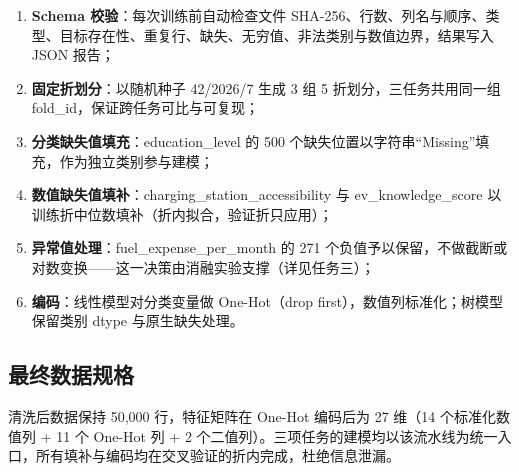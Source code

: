 \begin{enumerate}[itemsep=0pt]
\item \textbf{Schema 校验}：每次训练前自动检查文件 SHA-256、行数、列名与顺序、类型、目标存在性、重复行、缺失、无穷值、非法类别与数值边界，结果写入 JSON 报告；
\item \textbf{固定折划分}：以随机种子 42/2026/7 生成 3 组 5 折划分，三任务共用同一组 fold\_id，保证跨任务可比与可复现；
\item \textbf{分类缺失值填充}：education\_level 的 500 个缺失位置以字符串``Missing''填充，作为独立类别参与建模；
\item \textbf{数值缺失值填补}：charging\_station\_accessibility 与 ev\_knowledge\_score 以训练折中位数填补（折内拟合，验证折只应用）；
\item \textbf{异常值处理}：fuel\_expense\_per\_month 的 271 个负值予以保留，不做截断或对数变换——这一决策由消融实验支撑（详见任务三）；
\item \textbf{编码}：线性模型对分类变量做 One-Hot（drop first），数值列标准化；树模型保留类别 dtype 与原生缺失处理。
\end{enumerate}

\subsection{最终数据规格}

清洗后数据保持 50,000 行，特征矩阵在 One-Hot 编码后为 27 维（14 个标准化数值列 + 11 个 One-Hot 列 + 2 个二值列）。三项任务的建模均以该流水线为统一入口，所有填补与编码均在交叉验证的折内完成，杜绝信息泄漏。
